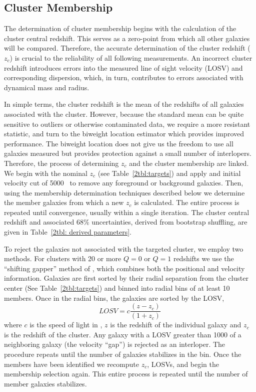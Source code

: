 \subsection{Cluster Membership}\label{2sec:cluster membership} 
The determination of cluster membership begins with the calculation of the cluster central redshift. This serves as a zero-point from which all other galaxies will be compared. Therefore, the accurate determination of the cluster redshift ($z_c$) is crucial to the reliability of all following measurements. An incorrect cluster redshift introduces errors into the measured line of sight velocity (LOSV) and corresponding dispersion, which, in turn, contributes to errors associated with dynamical mass and radius. 

In simple terms, the cluster redshift is the mean of the redshifts of all galaxies associated with the cluster. However, because the standard mean can be quite sensitive to outliers or otherwise contaminated data, we require a more resistant statistic, and turn to the biweight location estimator \citep{Beers1990} which provides improved performance. The biweight location does not give us the freedom to use all galaxies measured but provides protection against a small number of interlopers. Therefore, the process of determining $z_c$ and the cluster membership are linked. We begin with the nominal $z_c$ (see Table~\ref{2tbl:targets}) and apply and initial velocity cut of 5000 \kms\ to remove any foreground or background galaxies. Then, using the membership determination techniques described below we determine the member galaxies from which a new $z_c$ is calculated. The entire process is repeated until convergence, usually within a single iteration. The cluster central redshift and associated 68\% uncertainties, derived from bootstrap shuffling, are given in Table~\ref{2tbl: derived parameters}.

To reject the galaxies not associated with the targeted cluster, we employ two methods. For clusters with 20 or more $Q=0$ or $Q=1$ redshifts we use the ``shifting gapper'' method of , which combines both the positional and velocity information. Galaxies are first sorted by their radial separation from the cluster center (See Table~\ref{2tbl:targets}) and binned into radial bins of at least 10 members. Once in the radial bins, the galaxies are sorted by the LOSV, 
\begin{equation}
	LOSV = c\frac{(z-z_{c})}{(1+z_{c})} 
\end{equation}
where $c$ is the speed of light in \kms, $z$ is the redshift of the individual galaxy and $z_{c}$ is the redshift of the cluster. Any galaxy with a LOSV greater than 1000 \kms of a neighboring galaxy (the velocity ``gap'') is rejected as an interloper. The procedure repeats until the number of galaxies stabilizes in the bin. Once the members have been identified we recompute $z_c$, LOSVs, and begin the membership selection again. This entire process is repeated until the number of member galaxies stabilizes. 

